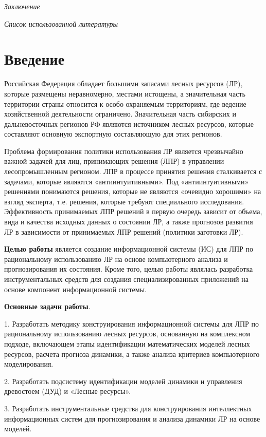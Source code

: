 \documentclass{article}
\begin{document}
\emph{Заключение \pageref{HToc199746743}}

\emph{Список использованной литературы \pageref{HToc199746744}\label{HToc128995768}\label{HToc199746714}}

\section*{\textbf{Введение }}

Российская Федерация обладает большими запасами 
лесных ресурсов (ЛР), которые размещены неравномерно, 
местами истощены, а значительная часть территории 
страны относится к особо охраняемым территориям, 
где ведение хозяйственной деятельности ограничено. 
Значительная часть сибирских и дальневосточных 
регионов РФ  являются источником лесных ресурсов, 
которые составляют основную экспортную составляющую 
для этих регионов.

Проблема формирования политики использования 
ЛР является чрезвычайно важной задачей для 
лиц, принимающих решения (ЛПР) в управлении 
лесопромышленным регионом. ЛПР  в процессе 
принятия решения сталкивается с задачами, которые 
являются «антиинтуитивными». Под «антиинтуитивными» 
решениями понимаются решения, которые не являются 
«очевидно хорошими» на взгляд эксперта, т.е. 
решения, которые требуют специального исследования. 
Эффективность принимаемых ЛПР решений в первую 
очередь зависит от объема, вида и качества исходных 
данных о состоянии ЛР, а также прогнозов развития 
ЛР в зависимости от принимаемых ЛПР решений 
(политики заготовки ЛР). 

\textbf{Целью работы} является создание информационной 
системы (ИС) для ЛПР по рациональному использованию 
ЛР на основе компьютерного анализа и прогнозирования 
их состояния. Кроме того, целью работы являлась 
разработка инструментальных средств для создания 
специализированных приложений на основе компонент 
информационной системы.

\textbf{Основные задачи работы}.

1. Разработать методику конструирования информационной 
системы для ЛПР по рациональному использованию 
лесных ресурсов, основанную на комплексном 
подходе, включающем этапы идентификации математических 
моделей лесных ресурсов, расчета прогноза динамики, 
а также анализа критериев компьютерного моделирования.

2. Разработать подсистему идентификации моделей 
динамики и управления древостоем (ДУД) и «Лесные 
ресурсы».

3. Разработать инструментальные средства для 
конструирования интеллектных информационных 
систем для прогнозирования и анализа динамики 
ЛР на основе моделей.
\end{document}
